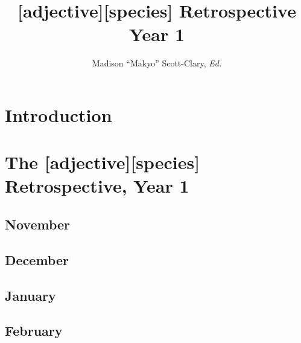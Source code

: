 \documentclass[12pt,letterpaper,oneside]{memoir}
\begin{document}
  \title{[adjective][species] Retrospective Year 1}
  \author{Madison ``Makyo'' Scott-Clary, \textit{Ed.}}
  \maketitle
  \newpage

  \tableofcontents

  \part{Introduction}
  

  \part{The [adjective][species] Retrospective, Year 1}
  \chapter{November}
  
  
  
  
  
  \chapter{December}
  
  
  
  
  \chapter{January}
  
  
  
  
  
  
  
  \chapter{February}
  
  
  
  
  
  
  
  
\end{document}

